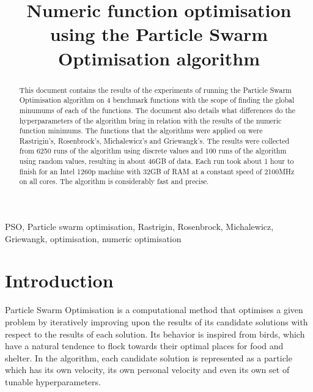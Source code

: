\documentclass[conference]{IEEEtran}
\begin{document}
\title{Numeric function optimisation using the Particle Swarm Optimisation algorithm}

\author{
}
\maketitle

\begin{abstract}
    This document contains the results of the experiments of running the Particle Swarm Optimisation algorithm on 4 benchmark
    functions with the scope of finding the global minumums of each of the functions. The document also details what differences
    do the hyperparameters of the algorithm bring in relation with the results of the numeric function minimums. The functions
    that the algorithms were applied on were Rastrigin's, Rosenbrock's, Michalewicz's and Griewangk's. The results were collected
    from 6250 runs of the algorithm using discrete values and 100 runs of the algorithm using random values, resulting in about
    46GB of data. Each run took about 1 hour to finish for an Intel 1260p machine with 32GB of RAM at a constant speed of
    2100MHz on all cores. The algorithm is considerably fast and precise.
\end{abstract}

\begin{IEEEkeywords}
PSO, Particle swarm optimisation, Rastrigin, Rosenbrock, Michalewicz, Griewangk, optimisation, numeric optimisation
\end{IEEEkeywords}

\section{Introduction}
Particle Swarm Optimisation is a computational method that optimises a given problem by iteratively improving upon the results
of its candidate solutions with respect to the results of each solution. Its behavior is inspired from birds, which have a natural
tendence to flock towards their optimal places for food and shelter. In the algorithm, each candidate solution is represented
as a particle which has its own velocity, its own personal velocity and even its own set of tunable hyperparameters.
\end{document}
